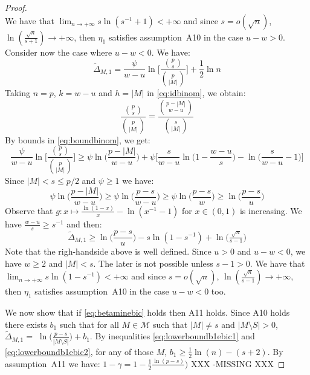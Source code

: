 \documentclass[aos]{imsart}
\theoremstyle{plain}
\begin{document}
\begin{supplement}
\begin{proof}
\begin{equation}
\end{equation}
 We have that $\lim_{n\to+\infty}s\ln(s^{-1}+1)< +\infty$ and since $s=o(\sqrt{n})$, $\ln(\tfrac{\sqrt{n}}{s+1}) \to +\infty$, then $\eta_1$ satisfies assumption~A10 in the case $u-w>0$.\\
 Consider now the case where $u-w<0$. We have:
     \begin{equation*}
        \tilde{\Delta}_{M,1}=\frac{\psi}{w-u}\ln\bigg[\frac{{p \choose s}}{{p \choose |M|}}\bigg]+ \frac{1}{2}\ln n
    \end{equation*}
 Taking $n=p$, $k=w-u$ and $h=|M|$ in \eqref{eq:idbinom}, we obtain:
     \begin{equation}\label{eq:identitybinom}
        \frac{{p \choose s}}{{p \choose |M|}}=
        \frac{{p - |M| \choose w-u}}{{s \choose |M|}}
    \end{equation}
By bounds in \eqref{eq:boundbinom}, we get:
$$ \frac{\psi}{w-u}\ln\bigg[\frac{{p \choose s}}{{p \choose |M|}}\bigg] \geq \psi\ln\bigg(\frac{p-|M|}{w-u}\bigg)+\psi\bigg[\frac{s}{w-u}\ln\bigg(1-\frac{w-u}{s}\bigg) -\ln\bigg(\frac{s}{w-u}-1\bigg) \bigg]$$
Since $|M|<s\leq p/2$ and $\psi\geq 1$ we have:
$$\psi\ln\bigg(\frac{p-|M|}{w-u}\bigg) \geq \psi\ln\bigg(\frac{p-s}{w-u}\bigg) \geq \psi\ln\bigg(\frac{p-s}{w}\bigg)\geq \ln\bigg(\frac{p-s}{u}\bigg)$$
Observe that $g:x \mapsto \frac{\ln(1-x)}{x}-\ln({x}^{-1}-1)$ for $x\in(0,1)$ is increasing. We have $\frac{w-u}{s} \geq s^{-1}$ and then: 
\begin{equation}
        \tilde{\Delta}_{M,1} \geq \ln\big(\frac{p-s}{u}\big)-s\ln(1-s^{-1})+ \ln \big(\tfrac{\sqrt{n}}{s-1}\big)
\end{equation}
Note that the righ-handside above is well defined. Since $u>0$ and $u-w<0$, we have $w\geq2$ and $|M|<s$. The later is not possible unless $s-1>0$. We have that $\lim_{n\to+\infty}s\ln(1-s^{-1})< +\infty$ and since $s=o(\sqrt{n})$, $\ln(\tfrac{\sqrt{n}}{s-1}) \to +\infty$, then $\eta_1$ satisfies assumption~A10 in the case $u-w<0$ too.

 We now show that if \eqref{eq:betaminebic} holds then A11 holds. Since A10 holds there exists $b_1$ such that for all $M\in\mathcal{M}$ such that $|M|\neq s$ and $|M\setminus S|>0$, $\tilde{\Delta}_{M, 1} =\;\ln\bigg(\frac{p-s}{|M \setminus S| }\bigg) + b_{1}$. By inequalities \eqref{eq:lowerboundb1ebic1} and \eqref{eq:lowerboundb1ebic2}, for any of those $M$, $b_1 \geq \tfrac{1}{2}\ln(n)-(s+2)$. By assumption~A11 we have: $1-\gamma=1-\frac{1}{2}\frac{\ln(p-s)}{})$ XXX -MISSING XXX


\end{proof}
\end{supplement}



\end{document}
